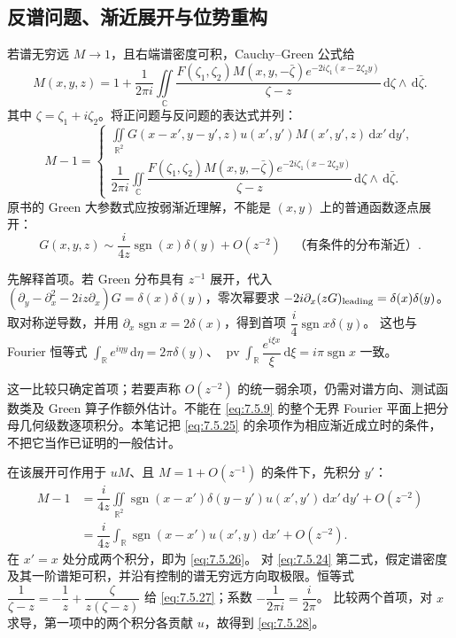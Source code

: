 \documentclass[lang=cn,scheme=chinese,mode=simple,device=normal,color=blue,math=cm,thmcnt=section,12pt]{elegantbook}
\newcommand{\dd}{\,\mathrm{d}}
\newcommand{\eqq}[2]{\tag{#1}\label{eq:#1}#2}
\DeclareMathOperator{\sgn}{sgn}
\begin{document}
\subsection{反谱问题、渐近展开与位势重构}
若谱无穷远 $M\to1$，且右端谱密度可积，Cauchy--Green 公式给
\begin{equation}
\eqq{7.5.23}{M(x,y,z)=1+\dfrac{1}{2\pi i}\iint\limits_{\mathbb C}
\dfrac{F(\zeta_1,\zeta_2)M(x,y,-\bar\zeta)e^{-2i\zeta_1(x-2\zeta_2y)}}{\zeta-z}
\dd\zeta\wedge\dd\bar\zeta.}
\end{equation}
其中 $\zeta=\zeta_1+i\zeta_2$。将正问题与反问题的表达式并列：
\begin{equation}
\eqq{7.5.24}{M-1=\begin{cases}
\displaystyle\iint\limits_{\mathbb R^2}G(x-x',y-y',z)u(x',y')M(x',y',z)\dd x'\dd y',\\[5pt]
\displaystyle\dfrac{1}{2\pi i}\iint\limits_{\mathbb C}
\dfrac{F(\zeta_1,\zeta_2)M(x,y,-\bar\zeta)e^{-2i\zeta_1(x-2\zeta_2y)}}{\zeta-z}\dd\zeta\wedge\dd\bar\zeta.
\end{cases}}
\end{equation}
原书的 Green 大参数式应按弱渐近理解，不能是 $(x,y)$ 上的普通函数逐点展开：
\begin{equation}
\eqq{7.5.25}{G(x,y,z)\sim\dfrac{i}{4z}\sgn(x)\delta(y)+O(z^{-2})
\quad\text{（有条件的分布渐近）}.}
\end{equation}
\begin{callout}
先解释首项。若 Green 分布具有 $z^{-1}$ 展开，代入
$(\partial_y-\partial_x^2-2iz\partial_x)G=\delta(x)\delta(y)$，零次幂要求
$-2i\partial_x(zG)_{\rm leading}=\delta(x)\delta(y)$。
取对称逆导数，并用 $\partial_x\sgn x=2\delta(x)$，得到首项 $\dfrac{i}{4}\sgn x\delta(y)$。
这也与 Fourier 恒等式
$\displaystyle\int_{\mathbb R}e^{i\eta y}\dd\eta=2\pi\delta(y)$、
$\operatorname{pv}\displaystyle\int_{\mathbb R}\dfrac{e^{i\xi x}}{\xi}\dd\xi=i\pi\sgn x$
一致。

这一比较只确定首项；若要声称 $O(z^{-2})$ 的统一弱余项，仍需对谱方向、测试函数类及 Green 算子作额外估计。不能在 \eqref{eq:7.5.9} 的整个无界 Fourier 平面上把分母几何级数逐项积分。本笔记把 \eqref{eq:7.5.25} 的余项作为相应渐近成立时的条件，不把它当作已证明的一般估计。

在该展开可作用于 $uM$、且 $M=1+O(z^{-1})$ 的条件下，先积分 $y'$：
\[
\begin{aligned}
M-1&=\dfrac{i}{4z}\iint\limits_{\mathbb R^2}\sgn(x-x')\delta(y-y')u(x',y')\dd x'\dd y'+O(z^{-2})\\
&=\dfrac{i}{4z}\int_{\mathbb R}\sgn(x-x')u(x',y)\dd x'+O(z^{-2}).
\end{aligned}
\]
在 $x'=x$ 处分成两个积分，即为 \eqref{eq:7.5.26}。
对 \eqref{eq:7.5.24} 第二式，假定谱密度及其一阶谱矩可积，并沿有控制的谱无穷远方向取极限。恒等式
$\dfrac{1}{\zeta-z}=-\dfrac{1}{z}+\dfrac{\zeta}{z(\zeta-z)}$
给 \eqref{eq:7.5.27}；系数 $-\dfrac{1}{2\pi i}=\dfrac{i}{2\pi}$。
比较两个首项，对 $x$ 求导，第一项中的两个积分各贡献 $u$，故得到 \eqref{eq:7.5.28}。
\end{callout}
\end{document}

